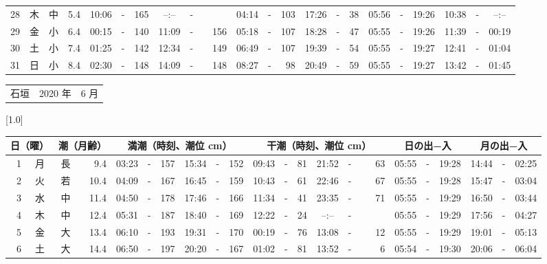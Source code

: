 \documentclass[12pt,a4j]{jsarticle}
\begin{document}
\begin{table}[htbp]
\begin{center}
{\begin{tabular}{|rc|cr|ccrccr|ccrccr|ccc|ccc|}
28 & 木 & 中 &  5.4 &  10:06 &-& 165 &  --:-- &-&~~~~~ &  04:14 &-& 103 &  17:26 &-&  38 & 05:56 & -& 19:26 & 10:38 & -& --:-- \\
29 & 金 & 小 &  6.4 &  00:15 &-& 140 &  11:09 &-& 156 &  05:18 &-& 107 &  18:28 &-&  47 & 05:55 & -& 19:26 & 11:39 & -& 00:19 \\
30 & 土 & 小 &  7.4 &  01:25 &-& 142 &  12:34 &-& 149 &  06:49 &-& 107 &  19:39 &-&  54 & 05:55 & -& 19:27 & 12:41 & -& 01:04 \\
31 & 日 & 小 &  8.4 &  02:30 &-& 148 &  14:09 &-& 148 &  08:27 &-&  98 &  20:49 &-&  59 & 05:55 & -& 19:27 & 13:42 & -& 01:45 \\
   \hline
   \end{tabular}}
   \end{center}
\end{table}
\newpage
 \begin{table}[htbp]
 \begin{center}
 \begin{tabular}{lcc}
 \LARGE{石垣}  & \large{2020 年} & \large{ 6 月} \\
 \end{tabular}
 \end{center}
 \begin{center}
    \scalebox{0.7}[1.0]{
    \begin{tabular}{|rc|cr|ccrccr|ccrccr|ccc|ccc|}
    \hline
    \multicolumn{2}{|c|}{日（曜）} & \multicolumn{2}{c|}{潮（月齢）} & \multicolumn{6}{c|}{満潮（時刻、潮位 cm）} & \multicolumn{6}{c|}{干潮（時刻、潮位 cm）} & \multicolumn{3}{c|}{日の出−入} &  \multicolumn{3}{c|}{月の出−入}\\
 \hline
 1 & 月 & 長 &  9.4 &  03:23 &-& 157 &  15:34 &-& 152 &  09:43 &-&  81 &  21:52 &-&  63 & 05:55 & -& 19:28 & 14:44 & -& 02:25 \\
 2 & 火 & 若 & 10.4 &  04:09 &-& 167 &  16:45 &-& 159 &  10:43 &-&  61 &  22:46 &-&  67 & 05:55 & -& 19:28 & 15:47 & -& 03:04 \\
 3 & 水 & 中 & 11.4 &  04:50 &-& 178 &  17:46 &-& 166 &  11:34 &-&  41 &  23:35 &-&  71 & 05:55 & -& 19:29 & 16:50 & -& 03:44 \\
 4 & 木 & 中 & 12.4 &  05:31 &-& 187 &  18:40 &-& 169 &  12:22 &-&  24 &  --:-- &-&~~~~~ & 05:55 & -& 19:29 & 17:56 & -& 04:27 \\
 5 & 金 & 大 & 13.4 &  06:10 &-& 193 &  19:31 &-& 170 &  00:19 &-&  76 &  13:08 &-&  12 & 05:55 & -& 19:29 & 19:01 & -& 05:13 \\
 6 & 土 & 大 & 14.4 &  06:50 &-& 197 &  20:20 &-& 167 &  01:02 &-&  81 &  13:52 &-&   6 & 05:54 & -& 19:30 & 20:06 & -& 06:04 \\

\end{tabular}}
\end{center}
\end{table}
\end{document}
